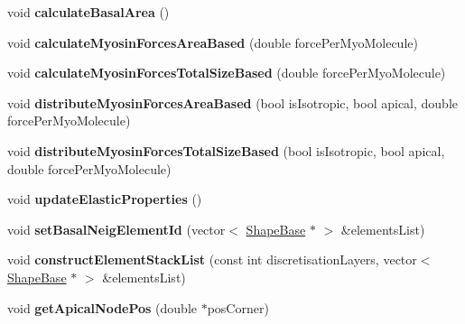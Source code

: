 \begin{DoxyCompactItemize}
\item 
\hypertarget{classPrism_aa8dd4b90cdaecdbabfb48f45a9bcdc95}{}void {\bfseries calculate\+Basal\+Area} ()\label{classPrism_aa8dd4b90cdaecdbabfb48f45a9bcdc95}

\item 
\hypertarget{classPrism_a299e77942291fa9c801a05507c0c42c1}{}void {\bfseries calculate\+Myosin\+Forces\+Area\+Based} (double force\+Per\+Myo\+Molecule)\label{classPrism_a299e77942291fa9c801a05507c0c42c1}

\item 
\hypertarget{classPrism_ad722dcddb4c3dbcec9871dcbebb74ff4}{}void {\bfseries calculate\+Myosin\+Forces\+Total\+Size\+Based} (double force\+Per\+Myo\+Molecule)\label{classPrism_ad722dcddb4c3dbcec9871dcbebb74ff4}

\item 
\hypertarget{classPrism_a3f50082590bbdd4181b9d018ff59fa5d}{}void {\bfseries distribute\+Myosin\+Forces\+Area\+Based} (bool is\+Isotropic, bool apical, double force\+Per\+Myo\+Molecule)\label{classPrism_a3f50082590bbdd4181b9d018ff59fa5d}

\item 
\hypertarget{classPrism_a3dac7ea4eea1289c8497ada2b3fd3443}{}void {\bfseries distribute\+Myosin\+Forces\+Total\+Size\+Based} (bool is\+Isotropic, bool apical, double force\+Per\+Myo\+Molecule)\label{classPrism_a3dac7ea4eea1289c8497ada2b3fd3443}

\item 
\hypertarget{classPrism_ace69b0f46bcd14fed2413fa2e24701e4}{}void {\bfseries update\+Elastic\+Properties} ()\label{classPrism_ace69b0f46bcd14fed2413fa2e24701e4}

\item 
\hypertarget{classPrism_ab2cc025be211e234a20c71c1cb12044a}{}void {\bfseries set\+Basal\+Neig\+Element\+Id} (vector$<$ \hyperlink{classShapeBase}{Shape\+Base} $\ast$ $>$ \&elements\+List)\label{classPrism_ab2cc025be211e234a20c71c1cb12044a}

\item 
\hypertarget{classPrism_a2617454fb5ce1f2e5a6496436a7798eb}{}void {\bfseries construct\+Element\+Stack\+List} (const int discretisation\+Layers, vector$<$ \hyperlink{classShapeBase}{Shape\+Base} $\ast$ $>$ \&elements\+List)\label{classPrism_a2617454fb5ce1f2e5a6496436a7798eb}

\item 
\hypertarget{classPrism_a243934a73a8f198ed592761ecb0927b9}{}void {\bfseries get\+Apical\+Node\+Pos} (double $\ast$pos\+Corner)\label{classPrism_a243934a73a8f198ed592761ecb0927b9}


\end{DoxyCompactItemize}

